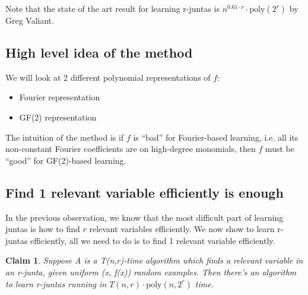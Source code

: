 \documentclass[12pt]{article}
\newtheorem{claim}[theorem]{Claim}
\newcommand{\poly}{\mathrm{poly}}
\begin{document}
Note that the state of the art result for learning r-juntas is
$n^{0.61 \cdot r} \cdot \poly(2^r)$ by Greg Valiant. 

\subsection{High level idea of the method}

We will look at 2 different polynomial representations of $f$:

\begin{itemize}
\item Fourier representation
\item GF(2) representation
\end{itemize}

The intuition of the method is if $f$ is ``bad'' for Fourier-based
learning, i.e. all its non-constant Fourier coefficients are on
high-degree monomials, then $f$ must be ``good'' for GF(2)-based
learning.

\subsection{Find 1 relevant variable efficiently is enough}

In the previous observation, we know that the most difficult part of
learning juntas is how to find $r$ relevant variables efficiently. We
now show to learn r-juntas efficiently, all we need to do is to find 1
relevant variable efficiently.

\begin{claim}
Suppose A is a T(n,r)-time algorithm which finds a relevant variable
in an r-junta, given uniform (x, f(x)) random examples. Then there's
an algorithm to learn r-juntas running in $T(n,r) \cdot \poly (n,
2^r)$ time.
\end{claim}
\end{document}
